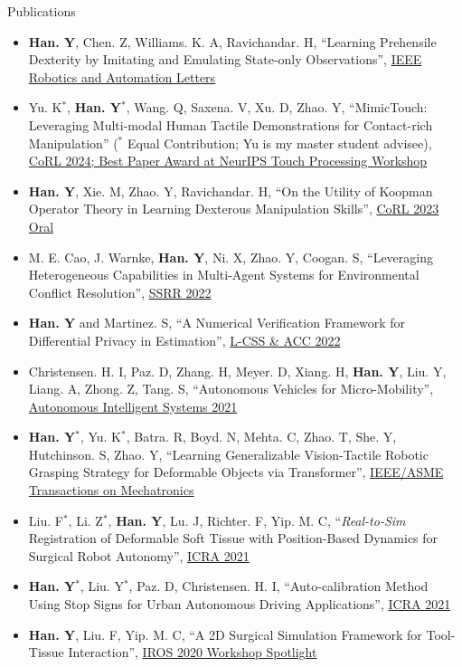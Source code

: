 \documentclass{resume} %
\begin{document}
\begin{rSection}{Publications}
\begin{itemize}
    \item \textbf{Han. Y}, Chen. Z, Williams. K. A, Ravichandar. H, ``Learning Prehensile Dexterity by Imitating and Emulating State-only Observations'', \href{https://arxiv.org/abs/2404.05582}{IEEE Robotics and Automation Letters}
    \item Yu. K$^*$, \textbf{Han. Y}$^*$, Wang. Q, Saxena. V, Xu. D, Zhao. Y, ``MimicTouch: Leveraging Multi-modal Human Tactile Demonstrations for Contact-rich Manipulation'' ($^*$ Equal Contribution; Yu is my master student advisee), \href{https://arxiv.org/abs/2310.16917}{CoRL 2024; Best Paper Award at NeurIPS Touch Processing Workshop}
    \item \textbf{Han. Y}, Xie. M, Zhao. Y, Ravichandar. H, ``On the Utility of Koopman Operator Theory in Learning Dexterous Manipulation Skills'', \href{http://arxiv.org/abs/2303.13446}{CoRL 2023 Oral}
    \item M. E. Cao, J. Warnke, \textbf{Han. Y}, Ni. X, Zhao. Y, Coogan. S, ``Leveraging Heterogeneous Capabilities in Multi-Agent Systems for Environmental Conflict Resolution'', \href{https://arxiv.org/abs/2206.01833}{SSRR 2022}
    \item \textbf{Han. Y} and Martinez. S, ``A Numerical Verification Framework for Differential Privacy in Estimation'', \href{https://arxiv.org/abs/2108.12094}{L-CSS \& ACC 2022}
    \item Christensen. H. I, Paz. D, Zhang. H, Meyer. D, Xiang. H, \textbf{Han. Y}, Liu. Y, Liang. A, Zhong. Z, Tang. S, ``Autonomous Vehicles for Micro-Mobility'', \href{https://link.springer.com/article/10.1007/s43684-021-00010-2}{Autonomous Intelligent Systems 2021}
    \item \textbf{Han. Y}$^*$, Yu. K$^*$, Batra. R, Boyd. N, Mehta. C, Zhao. T, She. Y, Hutchinson. S, Zhao. Y, ``Learning Generalizable Vision-Tactile Robotic Grasping Strategy for Deformable Objects via Transformer'', \href{https://arxiv.org/abs/2112.06374}{IEEE/ASME Transactions on Mechatronics}
    \item Liu. F$^*$, Li. Z$^*$, \textbf{Han. Y}, Lu. J, Richter. F, Yip. M. C, ``\textit{Real-to-Sim} Registration of Deformable Soft Tissue with Position-Based Dynamics for Surgical Robot Autonomy'', \href{https://arxiv.org/abs/2011.00800}{ICRA 2021}
    \item \textbf{Han. Y}$^*$, Liu. Y$^*$, Paz. D, Christensen. H. I, ``Auto-calibration Method Using Stop Signs for Urban Autonomous Driving Applications'', \href{https://arxiv.org/abs/2010.07441}{ICRA 2021}
    \item \textbf{Han. Y}, Liu. F, Yip. M. C, ``A 2D Surgical Simulation Framework for Tool-Tissue Interaction'', \href{https://arxiv.org/abs/2010.13936}{IROS 2020 Workshop Spotlight}
\end{itemize}
\end{rSection}
\end{document}
